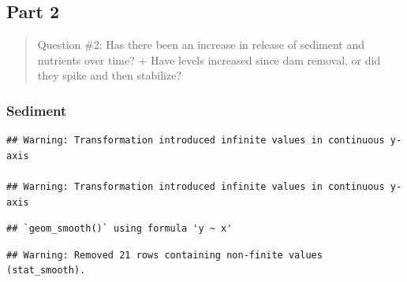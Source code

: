 \documentclass[
  12pt,
]{article}
\newenvironment{Shaded}{\begin{snugshade}}{\end{snugshade}}
\newcommand{\AttributeTok}[1]{\textcolor[rgb]{0.77,0.63,0.00}{#1}}
\newcommand{\CommentTok}[1]{\textcolor[rgb]{0.56,0.35,0.01}{\textit{#1}}}
\newcommand{\FunctionTok}[1]{\textcolor[rgb]{0.00,0.00,0.00}{#1}}
\newcommand{\NormalTok}[1]{#1}
\newcommand{\SpecialCharTok}[1]{\textcolor[rgb]{0.00,0.00,0.00}{#1}}
\newcommand{\StringTok}[1]{\textcolor[rgb]{0.31,0.60,0.02}{#1}}
\begin{document}
\newpage

\hypertarget{part-2}{%
\subsection{Part 2}\label{part-2}}

\begin{quote}
Question \#2: Has there been an increase in release of sediment and
nutrients over time? + Have levels increased since dam removal, or did
they spike and then stabilize?
\end{quote}

\hypertarget{sediment}{%
\subsubsection{Sediment}\label{sediment}}

\begin{Shaded}
\end{Shaded}

\begin{verbatim}
## Warning: Transformation introduced infinite values in continuous y-axis

## Warning: Transformation introduced infinite values in continuous y-axis
\end{verbatim}

\begin{verbatim}
## `geom_smooth()` using formula 'y ~ x'
\end{verbatim}

\begin{verbatim}
## Warning: Removed 21 rows containing non-finite values (stat_smooth).
\end{verbatim}
\end{document}

